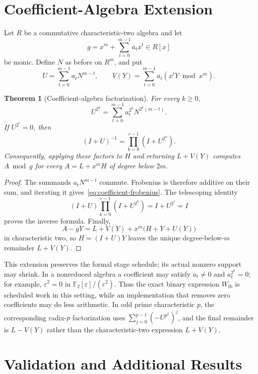 \documentclass{mcom-l}
\numberwithin{equation}{section}
\newtheorem{theorem}{Theorem}[section]
\theoremstyle{definition}
\theoremstyle{remark}
\newcommand{\Ftwo}{\mathbb{F}_2}
\newcommand{\Wfb}{W_{\mathrm{fb}}}
\begin{document}
\appendix

\section{Coefficient-Algebra Extension}
\label{app:coefficient-algebra}

Let $R$ be a commutative characteristic-two algebra and let
\[
  g=x^m+\sum_{t=0}^{m-1}a_tx^t\in R[x]
\]
be monic.  Define $N$ as before on $R^m$, and put
\[
  U=\sum_{t=0}^{m-1}a_tN^{m-t},
  \qquad
  V(Y)=\sum_{t=0}^{m-1}a_t(x^tY\bmod x^m).
\]

\begin{theorem}[Coefficient-algebra factorization]
For every $k\ge0$,
\begin{equation}
  U^{2^k}=\sum_{t=0}^{m-1}a_t^{2^k}N^{2^k(m-t)}.
  \label{eq:coefficient-frobenius}
\end{equation}
If $U^{2^r}=0$, then
\[
  (I+U)^{-1}=\prod_{k=0}^{r-1}(I+U^{2^k}).
\]
Consequently, applying these factors to $H$ and returning $L+V(Y)$ computes
$A\bmod g$ for every $A=L+x^mH$ of degree below $2m$.
\end{theorem}
\begin{proof}
The summands $a_tN^{m-t}$ commute.  Frobenius is therefore additive on their
sum, and iterating it gives~\eqref{eq:coefficient-frobenius}.  The telescoping
identity
\[
  (I+U)\prod_{k=0}^{r-1}(I+U^{2^k})=I+U^{2^r}=I
\]
proves the inverse formula.  Finally,
\[
  A-gY=L+V(Y)+x^m\bigl(H+Y+U(Y)\bigr)
\]
in characteristic two, so $H=(I+U)Y$ leaves the unique degree-below-$m$
remainder $L+V(Y)$.
\end{proof}

This extension preserves the formal stage schedule; its actual nonzero support
may shrink.  In a nonreduced algebra a coefficient may satisfy
$a_t\ne0$ and $a_t^{2^k}=0$; for example,
$\varepsilon^2=0$ in $\Ftwo[\varepsilon]/(\varepsilon^2)$.  Thus the exact
binary expression $\Wfb$ is scheduled work in this setting, while an
implementation that removes zero coefficients may do less arithmetic.  In
odd prime characteristic $p$, the corresponding radix-$p$ factorization uses
$\sum_{j=0}^{p-1}(-U^{p^k})^j$, and the final remainder is $L-V(Y)$ rather
than the characteristic-two expression $L+V(Y)$.

\section{Validation and Additional Results}
\label{app:validation}
\end{document}
